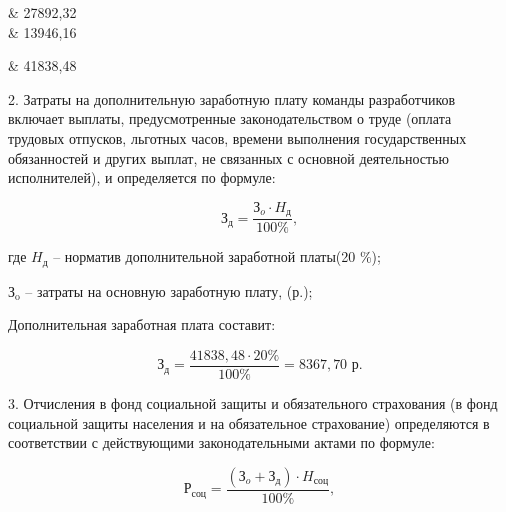 \begin{table}[!h!t]
\begin{tabular}
		\hline
		                                                                                              & 27892,32                                                                                                            \\

		\hline
		                                                                                       & 13946,16                                                                                                            \\
		\hline

		 & 41838,48                                                                                                            \\
		\hline
	\end{tabular}
\end{table}

2. Затраты на дополнительную заработную плату команды разработчиков включает выплаты, предусмотренные законодательством о труде (оплата трудовых отпусков, льготных часов, времени выполнения государственных обязанностей и других выплат, не связанных с основной деятельностью исполнителей), и определяется по формуле:

\begin{equation}
	\text{З}_{\text{д}} = \frac{\text{З}_{o}\cdot H_\text{д}}{100\%},

\end{equation}


где $H_\text{д}$ -- норматив дополнительной              заработной платы(20 \%);

$\text{З}_{\text{o}}$ -- затраты на основную заработную плату, (р.);




Дополнительная заработная плата составит:

$$
	\text{З}_{\text{д}} = \frac{41838,48 \cdot 20\%}{100\%} = 8367,70 \text{ р}.
$$

3. Отчисления в фонд социальной защиты и обязательного страхования (в фонд социальной защиты населения и на обязательное страхование) определяются в соответствии с действующими законодательными актами по формуле:

\begin{equation}
	\text{Р}_{\text{соц}} = \frac{(\text{З}_{o} + \text{З}_{\text{д}})\cdot H_\text{соц}}{100\%},
\end{equation}

